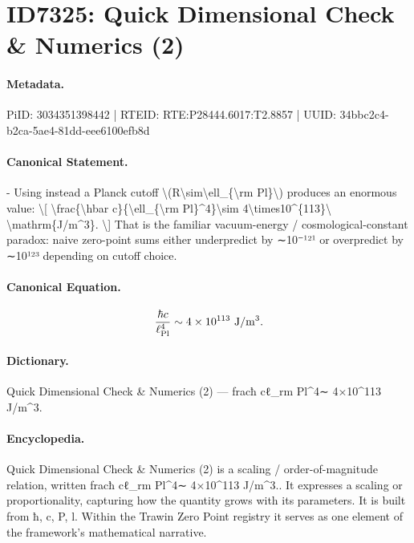 \section*{ID7325: Quick Dimensional Check \& Numerics (2)}
\paragraph{Metadata.}
PiID: 3034351398442 | RTEID: RTE:P28444.6017:T2.8857 | UUID: 34bbc2c4-b2ca-5ae4-81dd-eee6100efb8d

\paragraph{Canonical Statement.}
- Using instead a Planck cutoff \textbackslash{}(R\textbackslash{}sim\textbackslash{}ell\_\{\textbackslash{}rm Pl\}\textbackslash{}) produces an enormous value: \textbackslash{}[ \textbackslash{}frac\{\textbackslash{}hbar c\}\{\textbackslash{}ell\_\{\textbackslash{}rm Pl\}\textasciicircum{}4\}\textbackslash{}sim 4\textbackslash{}times10\textasciicircum{}\{113\}\textbackslash{} \textbackslash{}mathrm\{J/m\textasciicircum{}3\}. \textbackslash{}] That is the familiar vacuum-energy / cosmological-constant paradox: naive zero-point sums either underpredict by ∼10⁻¹²¹ or overpredict by ∼10¹²³ depending on cutoff choice.

\paragraph{Canonical Equation.}
\[
\frac{\hbar c}{\ell_{\rm Pl}^4}\sim 4\times10^{113}\ \mathrm{J/m^3}.
\]

\paragraph{Dictionary.}
Quick Dimensional Check \& Numerics (2) — fracħ cℓ\_rm Pl\textasciicircum{}4∼ 4×10\textasciicircum{}113 J/m\textasciicircum{}3.

\paragraph{Encyclopedia.}
Quick Dimensional Check \& Numerics (2) is a scaling / order-of-magnitude relation, written fracħ cℓ\_rm Pl\textasciicircum{}4∼ 4×10\textasciicircum{}113 J/m\textasciicircum{}3.. It expresses a scaling or proportionality, capturing how the quantity grows with its parameters. It is built from ħ, c, P, l. Within the Trawin Zero Point registry it serves as one element of the framework's mathematical narrative.
